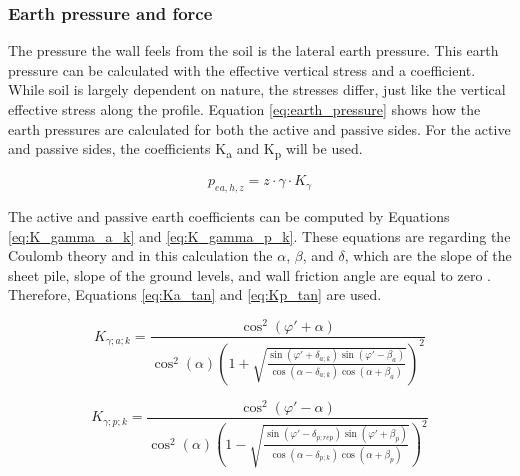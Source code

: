 \subsubsection{Earth pressure and force}

The pressure the wall feels from the soil is the lateral earth pressure. This earth pressure can be calculated with the effective vertical stress and a coefficient. While soil is largely dependent on nature, the stresses differ, just like the vertical effective stress along the profile. Equation \ref{eq:earth_pressure} shows how the earth pressures are calculated for both the active and passive sides. For the active and passive sides, the coefficients K\textsubscript{a} and K\textsubscript{p} will be used.

\begin{equation}
    p_{ea,h,z} = z \cdot \gamma \cdot K_{\gamma}
    \label{eq:earth_pressure}
\end{equation}

The active and passive earth coefficients can be computed by Equations \ref{eq:K_gamma_a_k} and \ref{eq:K_gamma_p_k}. These equations are regarding the Coulomb theory and in this calculation the $\alpha$, $\beta$, and $\delta$, which are the slope of the sheet pile, slope of the ground levels, and wall friction angle are equal to zero \autocite{grabeSheetPilingHandbook2008}. Therefore, Equations \ref{eq:Ka_tan} and \ref{eq:Kp_tan} are used.

\begin{equation}
    K_{\gamma;a;k} =
    \frac{
        \cos^{2}\!\left(\varphi' + \alpha\right)
    }{
        \cos^{2}(\alpha)
        \left(
            1 +
            \sqrt{
                \frac{
                    \sin\!\left(\varphi' + \delta_{a;k}\right)
                    \sin\!\left(\varphi' - \beta_a\right)
                }{
                    \cos\!\left(\alpha - \delta_{a;k}\right)
                    \cos\!\left(\alpha + \beta_a\right)
                }
            }
        \right)^{2}
    }
    \label{eq:K_gamma_a_k}
\end{equation}

\begin{equation}
    K_{\gamma;p;k} =
    \frac{
        \cos^{2}\!\left(\varphi' - \alpha\right)
    }{
        \cos^{2}(\alpha)
        \left(
            1 -
            \sqrt{
                \frac{
                    \sin\!\left(\varphi' - \delta_{p;rep}\right)
                    \sin\!\left(\varphi' + \beta_p\right)
                }{
                    \cos\!\left(\alpha - \delta_{p;k}\right)
                    \cos\!\left(\alpha + \beta_p\right)
                }
            }
        \right)^{2}
    }
    \label{eq:K_gamma_p_k}
\end{equation}

